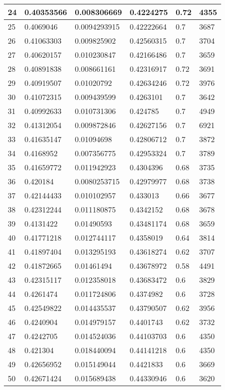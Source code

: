 \begin{longtable}{|l|l|l|l|l|l|}
24 & 0.40353566 & 0.008306669 & 0.4224275 & 0.72 & 4355 \\ \hline 
25 & 0.4069046 & 0.0094293915 & 0.42222664 & 0.7 & 3687 \\ \hline 
26 & 0.41063303 & 0.009825902 & 0.42560315 & 0.7 & 3704 \\ \hline 
27 & 0.40620157 & 0.010230847 & 0.42166486 & 0.7 & 3659 \\ \hline 
28 & 0.40891838 & 0.008661161 & 0.42316917 & 0.72 & 3691 \\ \hline 
29 & 0.40919507 & 0.01020792 & 0.42634246 & 0.72 & 3976 \\ \hline 
30 & 0.41072315 & 0.009439599 & 0.4263101 & 0.7 & 3642 \\ \hline 
31 & 0.40992633 & 0.010731306 & 0.424785 & 0.7 & 4949 \\ \hline 
32 & 0.41312054 & 0.009872846 & 0.42627156 & 0.7 & 6921 \\ \hline 
33 & 0.41635147 & 0.01094698 & 0.42806712 & 0.7 & 3872 \\ \hline 
34 & 0.4168952 & 0.007356775 & 0.42953324 & 0.7 & 3789 \\ \hline 
35 & 0.41659772 & 0.011942923 & 0.4304396 & 0.68 & 3735 \\ \hline 
36 & 0.420184 & 0.0080253715 & 0.42979977 & 0.68 & 3738 \\ \hline 
37 & 0.42144433 & 0.010102957 & 0.433013 & 0.66 & 3677 \\ \hline 
38 & 0.42312244 & 0.011180875 & 0.4342152 & 0.68 & 3678 \\ \hline 
39 & 0.4131422 & 0.01490593 & 0.43481174 & 0.68 & 3659 \\ \hline 
40 & 0.41771218 & 0.012744117 & 0.4358019 & 0.64 & 3814 \\ \hline 
41 & 0.41897404 & 0.013295193 & 0.43618274 & 0.62 & 3707 \\ \hline 
42 & 0.41872665 & 0.01461494 & 0.43678972 & 0.58 & 4491 \\ \hline 
43 & 0.42315117 & 0.012358018 & 0.43683472 & 0.6 & 3829 \\ \hline 
44 & 0.4261474 & 0.011724806 & 0.4374982 & 0.6 & 3728 \\ \hline 
45 & 0.42549822 & 0.014435537 & 0.43790507 & 0.62 & 3956 \\ \hline 
46 & 0.4240904 & 0.014979157 & 0.4401743 & 0.62 & 3732 \\ \hline 
47 & 0.4242705 & 0.014524036 & 0.44103703 & 0.6 & 4350 \\ \hline 
48 & 0.421304 & 0.018440094 & 0.44141218 & 0.6 & 4350 \\ \hline 
49 & 0.42656952 & 0.015149044 & 0.4421833 & 0.6 & 3669 \\ \hline 
50 & 0.42671424 & 0.015689438 & 0.44330946 & 0.6 & 3620 \\ \hline 
\end{longtable}